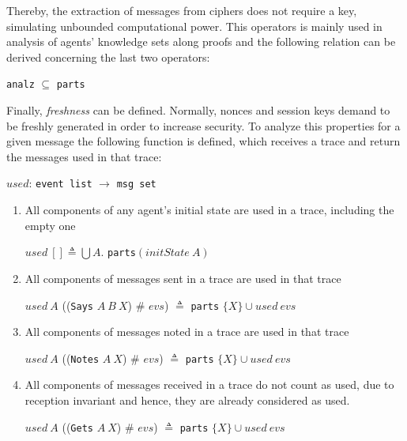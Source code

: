 Thereby, the extraction of messages from ciphers does not require a key, simulating unbounded computational power. This operators is mainly used in analysis of agents' knowledge sets along proofs and the following relation can be derived concerning the last two operators:

\begin{center}
  \texttt{analz} \(\subseteq \) \texttt{parts}
\end{center}

Finally, \textit{freshness} can be defined. Normally, nonces and session keys demand to be freshly generated in order to increase security. To analyze this properties for a given message the following function is defined, which receives a trace and return the messages used in that trace:

\begin{center}
  \(used\): \texttt{event list} \(\longrightarrow \) \texttt{msg set}
\end{center}

\begin{enumerate}
  \item All components of any agent's initial state are used in a trace, including the empty one
  \begin{center}
    \(used\ [] \triangleq \bigcup A\). \texttt{parts}\( (initState\ A)\)
  \end{center}
  \item All components of messages sent in a trace are used in that trace
  \begin{center}
    \(used\ A\) ((\texttt{Says} \(A\ B\ X\)) \# \(evs\)) \(\triangleq \) \texttt{parts} \( \{X\} \cup used\ evs\)
  \end{center}
  \item All components of messages noted in a trace are used in that trace
  \begin{center}
    \(used\ A\) ((\texttt{Notes} \(A\ X\)) \# \(evs\)) \(\triangleq \) \texttt{parts} \( \{X\} \cup used\ evs\)
  \end{center}
  \item All components of messages received in a trace do not count as used, due to reception invariant and hence, they are already considered as used.
  \begin{center}
    \(used\ A\) ((\texttt{Gets} \(A\ X\)) \# \(evs\)) \(\triangleq \) \texttt{parts} \( \{X\} \cup used\ evs\)
  \end{center}
\end{enumerate}

